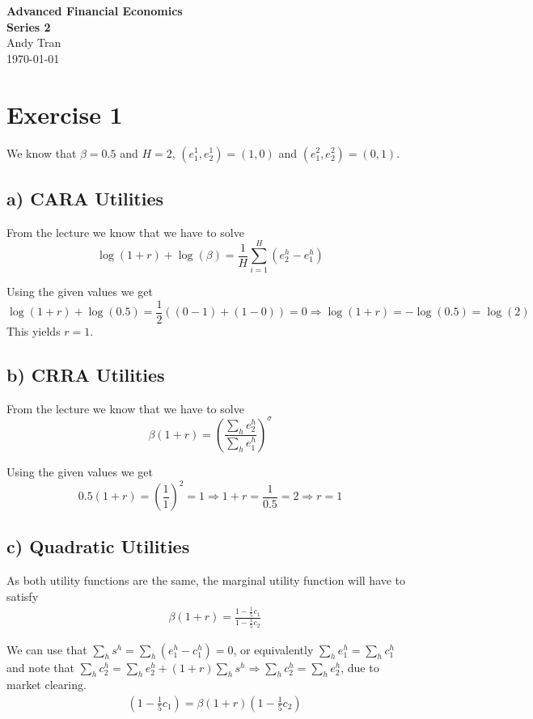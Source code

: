 \documentclass[11pt,a4paper]{article}
\begin{document}
\begin{center}
    \LARGE{\textbf{Advanced Financial Economics}}\\[0.5cm]
    \Large{\textbf{Series 2}}\\[0.5cm]
    \large{Andy Tran}\\[0.2cm]
    \large{\today}
\end{center}

\section*{Exercise 1}
We know that $\beta=0.5$ and $H=2$, $(e_1^1, e_2^1) = (1,0)$ and $(e_1^2, e_2^2) = (0,1)$.

\subsection*{a) CARA Utilities}
From the lecture we know that we have to solve
$$ \log(1+r) + \log(\beta) = \frac{1}{H} \sum_{i=1}^{H} (e_2^h - e_1^h)$$

Using the given values we get
$$ \log(1+r) + \log(0.5) = \frac{1}{2} ((0 - 1) + (1-0)) = 0 \Rightarrow \log(1+r) = -\log(0.5) = \log(2)$$
This yields $r=1$.

\subsection*{b) CRRA Utilities}
From the lecture we know that we have to solve
$$ \beta(1+r) = \left(\frac{\sum_h e_2^h}{\sum_h e_1^h}\right)^\sigma$$

Using the given values we get
$$ 0.5(1+r) = \left(\frac{1}{1}\right)^2 = 1 \Rightarrow 1+r = \frac{1}{0.5} = 2 \Rightarrow r=1$$

\subsection*{c) Quadratic Utilities}
As both utility functions are the same, the marginal utility function will have to satisfy 
\begin{align*}
&\beta(1+r) = \frac{1 - \frac{1}{5}c_1}{1-\frac{1}{5}c_2}
\end{align*}

We can use that $\sum_h s^h = \sum_h (e_1^h - c_1^h) = 0$, or equivalently
$\sum_h e_1^h = \sum_h c_1^h$ and note that $\sum_h c_2^h = \sum_h e_2^h + (1+r) \sum_h s^h \Rightarrow \sum_h c_2^h = \sum_h e_2^h$, due to market clearing.
\begin{align*}
&(1-\frac{1}{5}c_1) = \beta(1+r) (1-\frac{1}{5}c_2)
\end{align*}
\end{document}
